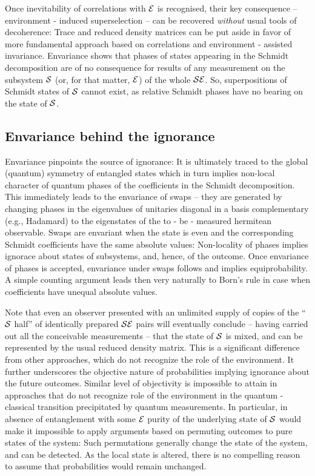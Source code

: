 \documentclass[aps,pra,epsfig,11pt,floatfix]{revtex4}
\begin{document}
Once inevitability of correlations with ${\cal E}$ is recognised, their key
consequence -- environment - induced superselection -- can be recovered
{\it without} usual tools of decoherence: Trace and reduced density matrices
can be put aside in favor of more fundamental approach based on correlations
and environment - assisted invariance. Envariance shows that phases of states
appearing in the Schmidt decomposition are of no consequence for results of any
measurement on the subsystem ${\cal S}$ (or, for that matter, ${\cal E}$) of
the whole ${\cal SE}$. So, superpositions of Schmidt states of ${\cal S}$ cannot
exist, as relative Schmidt phases have no bearing on the state of ${\cal S}$.

\subsection{Envariance behind the ignorance}

Envariance pinpoints the source of ignorance: It is ultimately traced to
the global (quantum) symmetry of entangled states which in turn implies
non-local character of quantum phases of the coefficients in the Schmidt
decomposition. This immediately leads to the envariance of swaps -- they are
generated by changing phases in the eigenvalues of unitaries diagonal 
in a basis complementary (e.g., Hadamard) to the eigenstates of the 
to - be - measured hermitean observable. Swaps are envariant when 
the state is even and the corresponding Schmidt
coefficients have the same absolute values: Non-locality of phases implies
ignorace about states of subsystems, and, hence, of the outcome. Once
envariance of phases is accepted, envariance under swaps follows and implies
equiprobability. A simple counting argument leads then very naturally to Born's
rule in case when coefficients have unequal absolute values.

Note that even an observer presented with an unlimited supply of copies of the
``${\cal S}$ half'' of identically prepared ${\cal SE}$ pairs will eventually
conclude -- having carried out all the conceivable measurements -- that the state
of ${\cal S}$ is mixed, and can be represented by the usual reduced density
matrix. This is a significant difference from other approaches, which do not
recognize the role of the environment. It further underscores the objective
nature of probabilities implying ignorance about the future outcomes. Similar
level of objectivity  is impossible to attain in approaches that do not
recognize role of the environment in the quantum - classical transition
precipitated by quantum measurements. In particular, in absence of entanglement
with some ${\cal E}$ purity of the underlying state of ${\cal S}$ would make
it impossible to apply arguments based on permuting outcomes
to pure states of the system: Such permutations generally change the state
of the system, and can be detected. As the local state is altered, there is no
compelling reason to assume that probabilities would remain unchanged.
\end{document}
